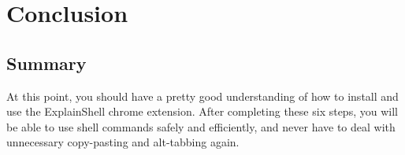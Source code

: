 \documentclass[11pt]{article}
\begin{document}
\section{Conclusion}
\subsection{Summary}
At this point, you should have a pretty good understanding of how to install and use the ExplainShell chrome extension. After completing these six steps, you will be able to use shell commands safely and efficiently, and never have to deal with unnecessary copy-pasting and alt-tabbing again.
\end{document}

